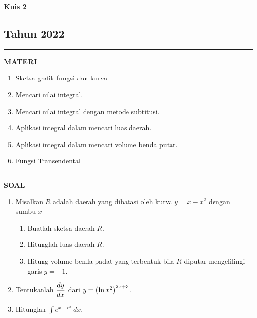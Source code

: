 \begin{flushright}
    \textbf{\Large{Kuis 2}}
    \subsection*{Tahun 2022}
\end{flushright}


\vspace{0.5cm}\hrule height 2pt\vspace{0.5cm}


\begin{center}
\textbf{\large{MATERI}}
\begin{enumerate}[leftmargin=*, label={\arabic*}.]
\item Sketsa grafik fungsi dan kurva.
\item Mencari nilai integral.
\item Mencari nilai integral dengan metode subtitusi.
\item Aplikasi integral dalam mencari luas daerah.
\item Aplikasi integral dalam mencari volume benda putar.
\item Fungsi Transendental
\end{enumerate}
\end{center}


\vspace{0.2cm}\hrule height 1pt\vspace{0.5cm}


\begin{center}
\textbf{\large{SOAL}}
\end{center}
\begin{enumerate}[leftmargin=*, label={\arabic*}.]
\item Misalkan $R$ adalah daerah yang dibatasi oleh kurva $y=x-x^{2}$ 
dengan sumbu-$x$.
    \begin{enumerate}[label={\alph*}.]
    \item Buatlah sketsa daerah $R$.
    \item Hitunglah luas daerah $R$.
    \item Hitung volume benda padat yang terbentuk bila $R$ diputar 
    mengelilingi garis $y=-1$.
    \end{enumerate}
\item Tentukanlah $\ds \frac{dy}{dx}$ dari $y=\brk*{\ln x^{2}}^{2x+3}$.
\item Hitunglah $\int e^{x+e^{x}}\,dx$.
\end{enumerate}


